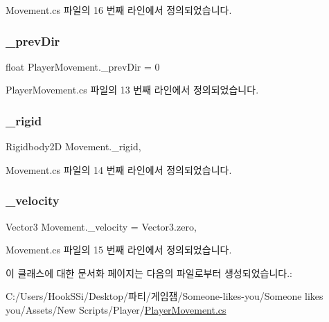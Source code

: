 Movement.\+cs 파일의 16 번째 라인에서 정의되었습니다.

\mbox{\label{class_player_movement_a802b794d028125d4e547a9caeb90d3d4}} 
\subsubsection{\texorpdfstring{\_prevDir}{\_prevDir}}
{\footnotesize\ttfamily float Player\+Movement.\+\_\+prev\+Dir = 0}



Player\+Movement.\+cs 파일의 13 번째 라인에서 정의되었습니다.

\mbox{\label{class_movement_a8b24a93b5f529e53c668ff81bde13c0d}} 
\subsubsection{\texorpdfstring{\_rigid}{\_rigid}}
{\footnotesize\ttfamily Rigidbody2D Movement.\+\_\+rigid\hspace{0.3cm}{\ttfamily [protected]}, {\ttfamily [inherited]}}



Movement.\+cs 파일의 14 번째 라인에서 정의되었습니다.

\mbox{\label{class_movement_a6ea6768262f1dca968be8ee5c14a0cc1}} 
\subsubsection{\texorpdfstring{\_velocity}{\_velocity}}
{\footnotesize\ttfamily Vector3 Movement.\+\_\+velocity = Vector3.\+zero\hspace{0.3cm}{\ttfamily [protected]}, {\ttfamily [inherited]}}



Movement.\+cs 파일의 15 번째 라인에서 정의되었습니다.



이 클래스에 대한 문서화 페이지는 다음의 파일로부터 생성되었습니다.\+:\begin{DoxyCompactItemize}
\item 
C\+:/\+Users/\+Hook\+S\+Si/\+Desktop/파티/게임잼/\+Someone-\/likes-\/you/\+Someone likes you/\+Assets/\+New Scripts/\+Player/\mbox{\hyperlink{_player_movement_8cs}{Player\+Movement.\+cs}}\end{DoxyCompactItemize}
